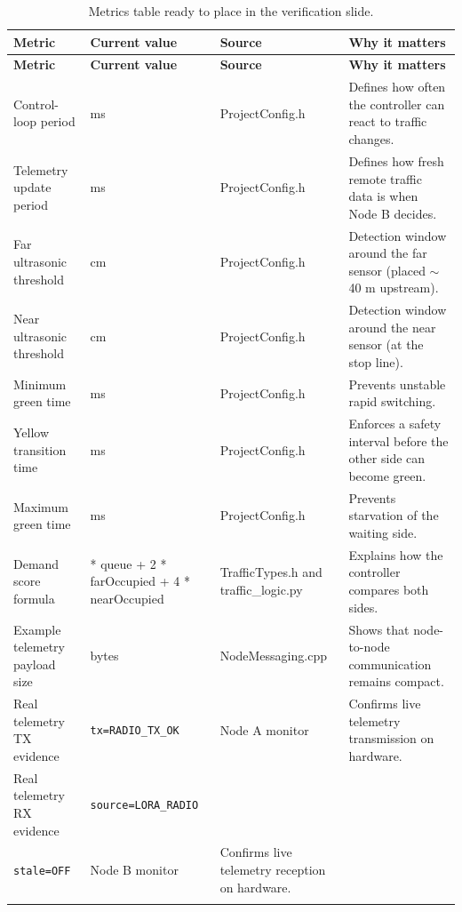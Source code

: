 \documentclass[11pt,a4paper]{article}
\begin{document}
\small
\begin{longtable}{>{\raggedright\arraybackslash}p{} >{\raggedright\arraybackslash}p{} >{\raggedright\arraybackslash}p{} >{\raggedright\arraybackslash}p{}}
\toprule
\textbf{Metric} & \textbf{Current value} & \textbf{Source} & \textbf{Why it matters} \\
\midrule
\endfirsthead
\toprule
\textbf{Metric} & \textbf{Current value} & \textbf{Source} & \textbf{Why it matters} \\
\midrule
\endhead
Control-loop period & 200 ms & ProjectConfig.h & Defines how often the controller can react to traffic changes. \\
Telemetry update period & 1000 ms & ProjectConfig.h & Defines how fresh remote traffic data is when Node B decides. \\
Far ultrasonic threshold & 100 cm & ProjectConfig.h & Detection window around the far sensor (placed $\sim$40 m upstream). \\
Near ultrasonic threshold & 100 cm & ProjectConfig.h & Detection window around the near sensor (at the stop line). \\
Minimum green time & 5000 ms & ProjectConfig.h & Prevents unstable rapid switching. \\
Yellow transition time & 2000 ms & ProjectConfig.h & Enforces a safety interval before the other side can become green. \\
Maximum green time & 20000 ms & ProjectConfig.h & Prevents starvation of the waiting side. \\
Demand score formula & 3 * queue + 2 * farOccupied + 4 * nearOccupied & TrafficTypes.h and traffic\_logic.py & Explains how the controller compares both sides. \\
Example telemetry payload size & 19 bytes & NodeMessaging.cpp & Shows that node-to-node communication remains compact. \\
Real telemetry TX evidence & \texttt{tx=RADIO\_TX\_OK} & Node A monitor & Confirms live telemetry transmission on hardware. \\
Real telemetry RX evidence & \texttt{source=LORA\_RADIO}\\\texttt{stale=OFF} & Node B monitor & Confirms live telemetry reception on hardware. \\
\bottomrule
\caption{Metrics table ready to place in the verification slide.}
\end{longtable}
\end{document}
